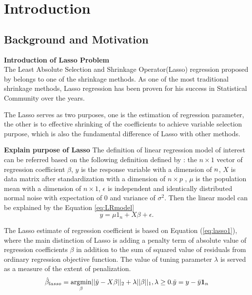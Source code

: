 \chapter{Introduction}
\label{Chapter1}
\section{Background and Motivation}



\textbf{Introduction of Lasso Problem}\\
The Least Absolute Selection and Shrinkage Operator(Lasso) regression proposed by \cite{tibshirani_1996} belongs to one of the shrinkage methods. As one of the most traditional shrinkage methods, Lasso regression has been proven for his success in Statistical Community over the years.

The Lasso serves as two purposes, one is the estimation of regression parameter, the other is to effective shrinking of the coefficients to achieve variable selection purpose, which is also the fundamental difference of Lasso with other methods. 

\textbf{Explain purpose of Lasso}
The definition of linear regression model of interest can be referred based on the following definition defined by \cite{tibshirani_1996}: the $n \times 1$ vector of regression coefficient $\beta$,  $y$ is the response variable with a dimension of $n \time 1$, $X$ is data matrix after standardization with a dimension of $n \times p$ , $\mu$ is the population mean with a dimension of $n \times 1$, $\epsilon$ is independent and identically distributed normal noise with expectation of 0 and variance of $\sigma^2$. Then the linear model can be explained by the Equation \ref{eq:LRmodel}
\begin{equation}
	\label{eq:LRmodel}
	y = \mu 1_n + X\beta + \epsilon.
\end{equation} 

 The Lasso estimate of regression coefficient is based on Equation (\ref{eq:lasso1}), where the main distinction of Lasso is adding a penalty term of absolute value of regression coefficients $\beta$ in addition to the sum of squared value of residuals from ordinary regression objective function. The value of tuning parameter $\lambda$ is served as a measure of the extent of penalization.
 \begin{equation}
 	\label{eq:lasso1}
 	\hat{\beta}_{lasso} = \underset{\beta}{\operatorname{argmin}} ||\tilde{y}-X\beta||_2 + \lambda ||\beta||_1, \lambda \geq 0. \tilde{y} =  y - \bar{y}\textbf{1}_n \\
 \end{equation}
  
